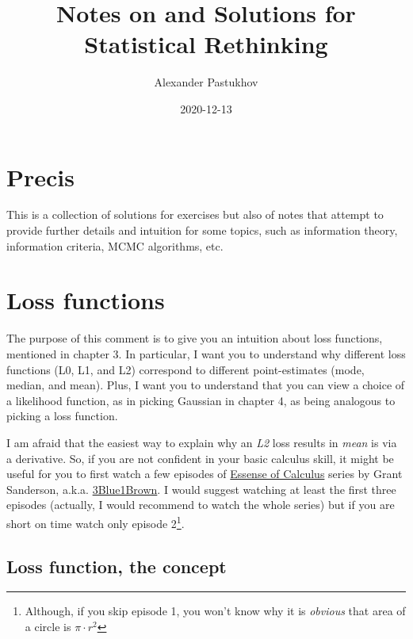 \documentclass[
]{book}
\title{Notes on and Solutions for Statistical Rethinking}
\author{Alexander Pastukhov}
\date{2020-12-13}
\begin{document}
\maketitle

{
\setcounter{tocdepth}{1}
\tableofcontents
}
\hypertarget{precis}{%
\chapter{Precis}\label{precis}}

This is a collection of solutions for exercises but also of notes that attempt to provide further details and intuition for some topics, such as information theory, information criteria, MCMC algorithms, etc.

\hypertarget{loss-functions}{%
\chapter{Loss functions}\label{loss-functions}}

The purpose of this comment is to give you an intuition about loss functions, mentioned in chapter 3. In particular, I want you to understand why different loss functions (L0, L1, and L2) correspond to different point-estimates (mode, median, and mean). Plus, I want you to understand that you can view a choice of a likelihood function, as in picking Gaussian in chapter 4, as being analogous to picking a loss function.

I am afraid that the easiest way to explain why an \emph{L2} loss results in \emph{mean} is via a derivative. So, if you are not confident in your basic calculus skill, it might be useful for you to first watch a few episodes of \href{https://www.youtube.com/playlist?list=PLZHQObOWTQDMsr9K-rj53DwVRMYO3t5Yr}{Essense of Calculus} series by Grant Sanderson, a.k.a. \href{https://www.3blue1brown.com/}{3Blue1Brown}. I would suggest watching at least the first three episodes (actually, I would recommend to watch the whole series) but if you are short on time watch only episode 2\footnote{Although, if you skip episode 1, you won't know why it is \emph{obvious} that area of a circle is \(\pi\cdot r^2\)}.

\hypertarget{loss-function-the-concept}{%
\section{Loss function, the concept}\label{loss-function-the-concept}}
\end{document}
